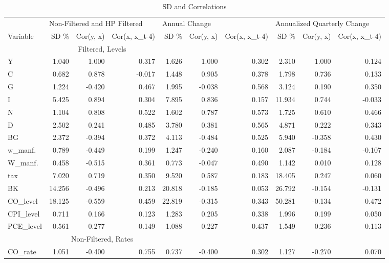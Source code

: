 \documentclass{article}
\begin{document}
\begin{table}[H!]
\caption{SD and Correlations}
\begin{adjustbox}{width=\textwidth,center}
\begin{tabular}{l|rrr|rrr|rrr}
\toprule
 \multicolumn{}{r}{}  & \multicolumn{3}{l}{Non-Filtered and HP Filtered} & \multicolumn{3}{l}{Annual Change} & \multicolumn{3}{l}{Annualized Quarterly Change} \\
Variable & SD \% & Cor(y, x) & Cor(x, x_{t-4}) & SD \% & Cor(y, x) & Cor(x, x_{t-4}) & SD \% & Cor(y, x) & Cor(x, x_{t-4}) \\ \hline
\midrule
& \multicolumn{3}{c|}{Filtered, Levels} & & & & & & \\
Y & 1.040 & 1.000 & 0.317 & 1.626 & 1.000 & 0.302 & 2.310 & 1.000 & 0.124 \\
C & 0.682 & 0.878 & -0.017 & 1.448 & 0.905 & 0.378 & 1.798 & 0.736 & 0.133 \\
G & 1.224 & -0.420 & 0.467 & 1.995 & -0.038 & 0.568 & 3.124 & 0.190 & 0.350 \\
I & 5.425 & 0.894 & 0.304 & 7.895 & 0.836 & 0.157 & 11.934 & 0.744 & -0.033 \\
N & 1.104 & 0.808 & 0.522 & 1.602 & 0.787 & 0.573 & 1.725 & 0.610 & 0.466 \\
D & 2.502 & 0.241 & 0.485 & 3.780 & 0.381 & 0.565 & 4.871 & 0.222 & 0.343 \\
BG & 2.372 & -0.394 & 0.372 & 4.113 & -0.484 & 0.525 & 5.940 & -0.358 & 0.430 \\
w_{manf.} & 0.789 & -0.449 & 0.199 & 1.247 & -0.240 & 0.160 & 2.087 & -0.184 & -0.107 \\
W_{manf.} & 0.458 & -0.515 & 0.361 & 0.773 & -0.047 & 0.490 & 1.142 & 0.010 & 0.128 \\
tax & 7.020 & 0.719 & 0.350 & 9.520 & 0.587 & 0.183 & 18.405 & 0.247 & 0.060 \\
BK & 14.256 & -0.496 & 0.213 & 20.818 & -0.185 & 0.053 & 26.792 & -0.154 & -0.131 \\
CO_{level} & 18.125 & -0.559 & 0.459 & 22.819 & -0.315 & 0.343 & 50.281 & -0.134 & 0.472 \\
CPI_{level} & 0.711 & 0.166 & 0.123 & 1.283 & 0.205 & 0.338 & 1.996 & 0.199 & 0.050 \\
PCE_{level} & 0.561 & 0.277 & 0.149 & 1.088 & 0.227 & 0.437 & 1.549 & 0.236 & 0.113 \\
\hline
& \multicolumn{3}{c|}{Non-Filtered, Rates} & & & & & & \\
CO_{rate} & 1.051 & -0.400 & 0.755 & 0.737 & -0.400 & 0.302 & 1.127 & -0.270 & 0.070 \\

\end{tabular}
\end{adjustbox}
\end{table}
\end{document}
